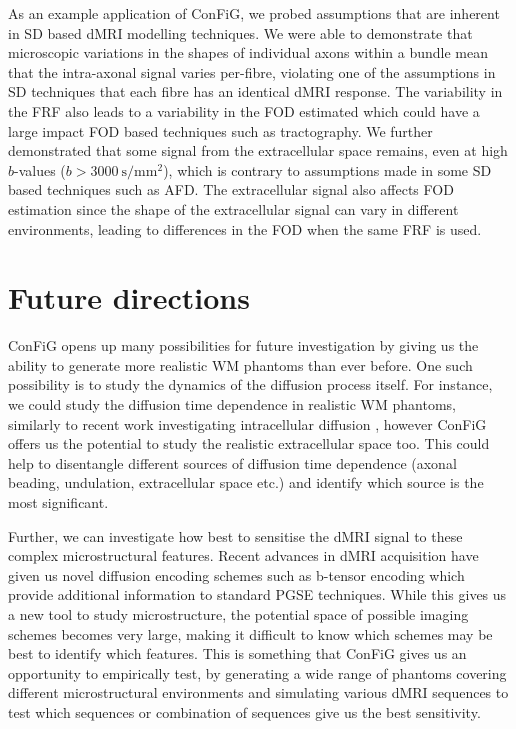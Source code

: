 As an example application of \ac{ConFiG}, we probed assumptions that are inherent in \acf{SD} based \ac{dMRI} modelling techniques.
We were able to demonstrate that microscopic variations in the shapes of individual axons within a bundle mean that the intra-axonal signal varies per-fibre, violating one of the assumptions in \ac{SD} techniques that each fibre has an identical \ac{dMRI} response. The variability in the \ac{FRF} also leads to a variability in the \ac{FOD} estimated which could have a large impact \ac{FOD} based techniques such as tractography.
We further demonstrated that some signal from the extracellular space remains, even at high $b$-values ($b>\SI{3000}{\second\per\milli\metre\squared}$), which is contrary to assumptions made in some \ac{SD} based techniques such as \acf{AFD}.
The extracellular signal also affects \ac{FOD} estimation since the shape of the extracellular signal can vary in different environments, leading to differences in the \ac{FOD} when the same \ac{FRF} is used.



\section{Future directions}
\label{sec:conc_future_directions}
\ac{ConFiG} opens up many possibilities for future investigation by giving us the ability to generate more realistic \ac{WM} phantoms than ever before. One such possibility is to study the dynamics of the diffusion process itself. For instance, we could study the diffusion time dependence in realistic \ac{WM} phantoms, similarly to recent work investigating intracellular diffusion \cite{Andersson2020,Lee2019a}, however \ac{ConFiG} offers us the potential to study the realistic extracellular space too. This could help to disentangle different sources of diffusion time dependence (axonal beading, undulation, extracellular space etc.) and identify which source is the most significant.


Further, we can investigate how best to sensitise the \ac{dMRI} signal to these complex microstructural features. Recent advances in \ac{dMRI} acquisition have given us novel diffusion encoding schemes such as b-tensor encoding \cite{Westin2016} which provide additional information to standard \ac{PGSE} techniques.
While this gives us a new tool to study microstructure, the potential space of possible imaging schemes becomes very large, making it difficult to know which schemes may be best to identify which features. 
This is something that \ac{ConFiG} gives us an opportunity to empirically test, by generating a wide range of phantoms covering different microstructural environments and simulating various \ac{dMRI} sequences to test which sequences or combination of sequences give us the best sensitivity.

